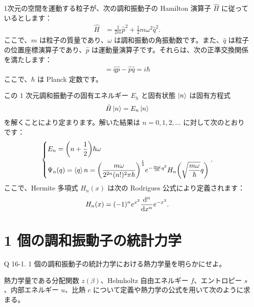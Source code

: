 \documentclass[uplatex,dvipdfmx,a4paper,11pt]{jlreq}
\theoremstyle{definition}
\begin{document}
1次元の空間を運動する粒子が、次の調和振動子の Hamilton 演算子 $\hat{H}$ に従っているとします：
\begin{align}
  \hat{H} & = \frac{1}{2m}\hat{p}^2 + \frac{1}{2}m\omega^2\hat{q}^2.
\end{align}
ここで、$m$ は粒子の質量であり、$\omega$ は調和振動の角振動数です。また、$\hat{q}$ は粒子の位置座標演算子であり、$\hat{p}$ は運動量演算子です。それらは、次の正準交換関係を満たします：
\begin{align}
  [\hat{q}, \hat{p}] = \hat{q}\hat{p} - \hat{p}\hat{q} = i\hbar
\end{align}
ここで、$\hbar$ は Planck 定数です。

この 1 次元調和振動子の固有エネルギー $E_h$ と固有状態 $\ket{n}$ は固有方程式
\begin{align}
  \hat{H}\ket{n} = E_n\ket{n}
\end{align}
を解くことにより定まります。解いた結果は $n = 0, 1, 2, \ldots$ に対して次のとおりです：
\begin{align}
  \begin{dcases}
    E_n        = \qty(n + \frac{1}{2})\hbar\omega \\
    \Psi_n(q) = \braket{q}{n} = \qty(\frac{m\omega}{2^{2n}(n!)^2\pi\hbar})^{\frac{1}{4}}e^{-\frac{m\omega}{2\hbar}q^2}H_n\qty(\sqrt{\frac{m\omega}{\hbar}}q)
  \end{dcases}.
\end{align}
ここで、Hermite 多項式 $H_n(x)$ は次の Rodrigues 公式により定義されます：
\begin{align}
  H_n(x) = (-1)^ne^{x^2}\dv[n]{x}e^{-x^2}.
\end{align}

\section{1 個の調和振動子の統計力学}
\begin{itembox}[l]{Q 16-1.}
  1 個の調和振動子の統計力学における熱力学量を明らかにせよ。
\end{itembox}

熱力学量である分配関数 $z(\beta)$、Helmholtz 自由エネルギー $f$、エントロピー $s$、内部エネルギー $u$、比熱 $c$ について定義や熱力学の公式を用いて次のように求まる。
\end{document}
